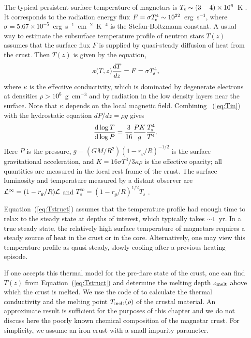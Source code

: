 The typical persistent surface temperature of magnetars is $T_{\rm s}\sim (3-4)\times 10^6$~K \citep{2006csxs.book..547W}. 
It corresponds to the radiation energy flux $F=\sigma T_{\rm s}^4\sim 10^{22}$~erg~s$^{-1}$, where $\sigma=5.67\times 10^{-5}$~erg~s$^{-1}$~cm$^{-2}$~K$^{-4}$ is the Stefan-Boltzmann constant. 
A usual way to estimate the subsurface temperature profile of neutron stars $T(z)$ assumes that the surface flux $F$ is supplied by quasi-steady diffusion of heat from the crust. Then $T(z)$ is given by the equation,
\begin{equation}
\label{eq:Tin}
   \kappa(T,z) \frac{dT}{dz} =F=\sigma T_{\rm s}^4,
\end{equation}
where $\kappa$ is the effective conductivity, which is dominated by degenerate electrons at densities $\rho>10^6$~g~cm$^{-3}$ and by radiation in the low density layers near the surface. 
Note that $\kappa$ depends on the local magnetic field. 
Combining \Eq~(\ref{eq:Tin}) with the hydrostatic equation $dP/dz=\rho g$ gives
\begin{equation}
\label{eq:Tstruct}
   \frac{\mathrm{d} \log T}{\mathrm{d} \log P}=\frac{3}{16}\frac{PK}{g}\frac{T_{\rm s}^4}{T^4}.
\end{equation}
Here $P$ is the pressure, $g=(GM/R^2)(1-r_g/R)^{-1/2}$ is the surface gravitational acceleration, and $K=16\sigma T^3 /3\kappa \rho$ is the effective opacity; all quantities are measured in the local rest frame of the crust. The surface luminosity and temperature measured by a distant observer are $\mathcal{L}^\infty = (1-r_g/R)\mathcal{L}$ and $T_s^{\infty} = (1-r_g/R)^{1/2} T_s$ \citep{1977ApJ...212..825T}.

Equation~(\ref{eq:Tstruct}) assumes that the temperature profile had enough time to relax to the steady state at depths of interest, which typically takes $\sim 1$~yr. 
In a true steady state, the relatively high surface temperature of magnetars requires a steady source of heat in the crust \citep{2006MNRAS.371..477K}
or in the core.
Alternatively, one may view this temperature profile as qausi-steady, slowly cooling after a previous heating episode.

If one accepts this thermal model for the pre-flare state of the crust, one can find $T(z)$ from Equation~(\ref{eq:Tstruct}) and determine the melting depth $z_{\rm melt}$ above which the crust is melted. 
We use the code of \citet{1999A&A...351..787P} to calculate the thermal conductivity and the melting point $T_{\rm melt}(\rho)$ of the crustal material. 
An approximate result is sufficient for the purposes of this chapter and we do not discuss here the poorly known chemical composition of the magnetar crust. 
For simplicity, we assume an iron crust with a small impurity parameter.

